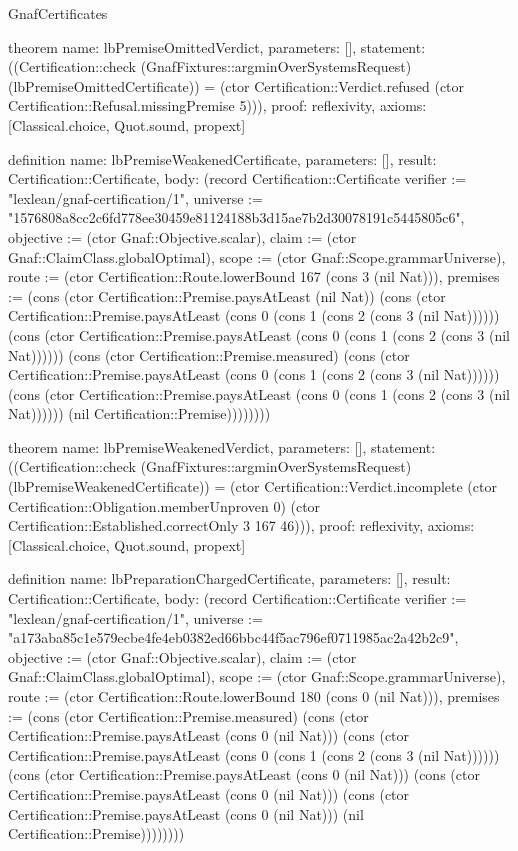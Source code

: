 \begin{lexlean}{GnafCertificates}
\begin{semanticmodule}
theorem{
  name: lbPremiseOmittedVerdict,
  parameters: [],
  statement: ((Certification::check (GnafFixtures::argminOverSystemsRequest) (lbPremiseOmittedCertificate)) = (ctor Certification::Verdict.refused (ctor Certification::Refusal.missingPremise 5))),
  proof: reflexivity{},
  axioms: [Classical.choice, Quot.sound, propext]
}

definition{
  name: lbPremiseWeakenedCertificate,
  parameters: [],
  result: Certification::Certificate,
  body: (record Certification::Certificate {verifier := "lexlean/gnaf-certification/1", universe := "1576808a8cc2c6fd778ee30459e81124188b3d15ae7b2d30078191c5445805c6", objective := (ctor Gnaf::Objective.scalar), claim := (ctor Gnaf::ClaimClass.globalOptimal), scope := (ctor Gnaf::Scope.grammarUniverse), route := (ctor Certification::Route.lowerBound 167 (cons 3 (nil Nat))), premises := (cons (ctor Certification::Premise.paysAtLeast (nil Nat)) (cons (ctor Certification::Premise.paysAtLeast (cons 0 (cons 1 (cons 2 (cons 3 (nil Nat)))))) (cons (ctor Certification::Premise.paysAtLeast (cons 0 (cons 1 (cons 2 (cons 3 (nil Nat)))))) (cons (ctor Certification::Premise.measured) (cons (ctor Certification::Premise.paysAtLeast (cons 0 (cons 1 (cons 2 (cons 3 (nil Nat)))))) (cons (ctor Certification::Premise.paysAtLeast (cons 0 (cons 1 (cons 2 (cons 3 (nil Nat)))))) (nil Certification::Premise)))))))})
}

theorem{
  name: lbPremiseWeakenedVerdict,
  parameters: [],
  statement: ((Certification::check (GnafFixtures::argminOverSystemsRequest) (lbPremiseWeakenedCertificate)) = (ctor Certification::Verdict.incomplete (ctor Certification::Obligation.memberUnproven 0) (ctor Certification::Established.correctOnly 3 167 46))),
  proof: reflexivity{},
  axioms: [Classical.choice, Quot.sound, propext]
}

definition{
  name: lbPreparationChargedCertificate,
  parameters: [],
  result: Certification::Certificate,
  body: (record Certification::Certificate {verifier := "lexlean/gnaf-certification/1", universe := "a173aba85c1e579ecbe4fe4eb0382ed66bbc44f5ac796ef0711985ac2a42b2c9", objective := (ctor Gnaf::Objective.scalar), claim := (ctor Gnaf::ClaimClass.globalOptimal), scope := (ctor Gnaf::Scope.grammarUniverse), route := (ctor Certification::Route.lowerBound 180 (cons 0 (nil Nat))), premises := (cons (ctor Certification::Premise.measured) (cons (ctor Certification::Premise.paysAtLeast (cons 0 (nil Nat))) (cons (ctor Certification::Premise.paysAtLeast (cons 0 (cons 1 (cons 2 (cons 3 (nil Nat)))))) (cons (ctor Certification::Premise.paysAtLeast (cons 0 (nil Nat))) (cons (ctor Certification::Premise.paysAtLeast (cons 0 (nil Nat))) (cons (ctor Certification::Premise.paysAtLeast (cons 0 (nil Nat))) (nil Certification::Premise)))))))})
}


\end{semanticmodule}
\end{lexlean}
